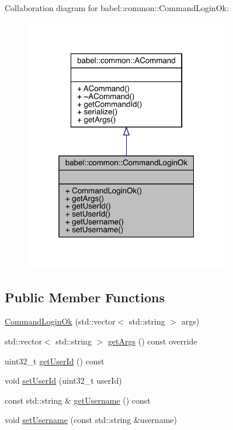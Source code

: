 Collaboration diagram for babel\+:\+:common\+:\+:Command\+Login\+Ok\+:\nopagebreak
\begin{figure}[H]
\begin{center}
\leavevmode
\includegraphics[width=253pt]{classbabel_1_1common_1_1_command_login_ok__coll__graph}
\end{center}
\end{figure}
\subsection*{Public Member Functions}
\begin{DoxyCompactItemize}
\item 
\mbox{\hyperlink{classbabel_1_1common_1_1_command_login_ok_a52d291158086994baed776a75d565221}{Command\+Login\+Ok}} (std\+::vector$<$ std\+::string $>$ args)
\item 
std\+::vector$<$ std\+::string $>$ \mbox{\hyperlink{classbabel_1_1common_1_1_command_login_ok_af7bbc68d6cbe71a9935b19c19fdf0592}{get\+Args}} () const override
\item 
uint32\+\_\+t \mbox{\hyperlink{classbabel_1_1common_1_1_command_login_ok_ad1743b00ef6aed9e23e31ca71a97ea3a}{get\+User\+Id}} () const
\item 
void \mbox{\hyperlink{classbabel_1_1common_1_1_command_login_ok_acbdc309e362e43b2c572e6f080f86e4a}{set\+User\+Id}} (uint32\+\_\+t user\+Id)
\item 
const std\+::string \& \mbox{\hyperlink{classbabel_1_1common_1_1_command_login_ok_a40d0aaea950b83834a300702f543181c}{get\+Username}} () const
\item 
void \mbox{\hyperlink{classbabel_1_1common_1_1_command_login_ok_ad01f7bbbb944b3fe0f42fcf784ec134e}{set\+Username}} (const std\+::string \&username)
\end{DoxyCompactItemize}


